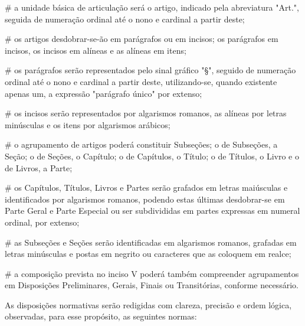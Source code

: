 \documentclass[a4paper,capitulo,titlepage=false]{br-lex}
\begin{document}
\begin{easylist}
# a unidade básica de articulação será o artigo, indicado pela abreviatura "Art.", seguida de numeração ordinal até o nono e cardinal a partir deste;

# os artigos desdobrar-se-ão em parágrafos ou em incisos; os parágrafos em incisos, os incisos em alíneas e as alíneas em itens;

# os parágrafos serão representados pelo sinal gráfico "§", seguido de numeração ordinal até o nono e cardinal a partir deste, utilizando-se, quando existente apenas um, a expressão "parágrafo único" por extenso;

# os incisos serão representados por algarismos romanos, as alíneas por letras minúsculas e os itens por algarismos arábicos;

# o agrupamento de artigos poderá constituir Subseções; o de Subseções, a Seção; o de Seções, o Capítulo; o de Capítulos, o Título; o de Títulos, o Livro e o de Livros, a Parte;

# os Capítulos, Títulos, Livros e Partes serão grafados em letras maiúsculas e identificados por algarismos romanos, podendo estas últimas desdobrar-se em Parte Geral e Parte Especial ou ser subdivididas em partes expressas em numeral ordinal, por extenso;

# as Subseções e Seções serão identificadas em algarismos romanos, grafadas em letras minúsculas e postas em negrito ou caracteres que as coloquem em realce;

# a composição prevista no inciso V poderá também compreender agrupamentos em Disposições Preliminares, Gerais, Finais ou Transitórias, conforme necessário.	
\end{easylist}

\artigo As disposições normativas serão redigidas com clareza, precisão e ordem lógica, observadas, para esse propósito, as seguintes normas: 
\end{document}
